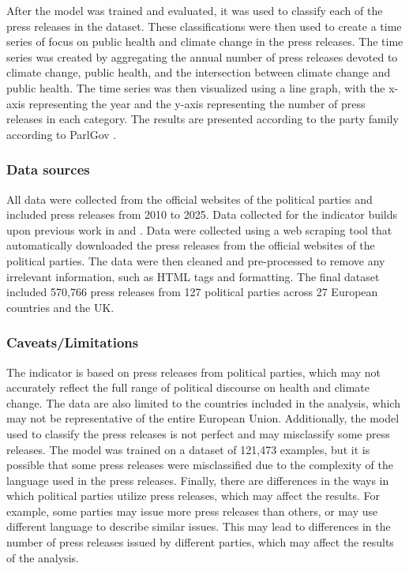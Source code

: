 \documentclass[
  letterpaper,
  DIV=11,
  numbers=noendperiod]{scrartcl}
\begin{document}
After the model was trained and evaluated, it was used to classify each
of the press releases in the dataset. These classifications were then
used to create a time series of focus on public health and climate
change in the press releases. The time series was created by aggregating
the annual number of press releases devoted to climate change, public
health, and the intersection between climate change and public health.
The time series was then visualized using a line graph, with the x-axis
representing the year and the y-axis representing the number of press
releases in each category. The results are presented according to the
party family according to ParlGov \citep{doring2012parliament}.

\subsubsection{Data sources}\label{data-sources}

All data were collected from the official websites of the political
parties and included press releases from 2010 to 2025. Data collected
for the indicator builds upon previous work in
\citet{erfort2023partypress} and \citet{dickson2024going}. Data were
collected using a web scraping tool that automatically downloaded the
press releases from the official websites of the political parties. The
data were then cleaned and pre-processed to remove any irrelevant
information, such as HTML tags and formatting. The final dataset
included 570,766 press releases from 127 political parties across 27
European countries and the UK.

\subsubsection{Caveats/Limitations}\label{caveatslimitations}

The indicator is based on press releases from political parties, which
may not accurately reflect the full range of political discourse on
health and climate change. The data are also limited to the countries
included in the analysis, which may not be representative of the entire
European Union. Additionally, the model used to classify the press
releases is not perfect and may misclassify some press releases. The
model was trained on a dataset of 121,473 examples, but it is
possible that some press releases were misclassified due to the
complexity of the language used in the press releases. Finally, there
are differences in the ways in which political parties utilize press
releases, which may affect the results. For example, some parties may
issue more press releases than others, or may use different language to
describe similar issues. This may lead to differences in the number of
press releases issued by different parties, which may affect the results
of the analysis.
\end{document}

